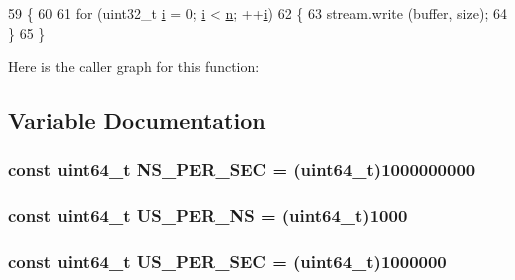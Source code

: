 \begin{DoxyCode}
59 \{
60 
61   \textcolor{keywordflow}{for} (uint32\_t \hyperlink{bernuolliDistribution_8m_a6f6ccfcf58b31cb6412107d9d5281426}{i} = 0; \hyperlink{bernuolliDistribution_8m_a6f6ccfcf58b31cb6412107d9d5281426}{i} < \hyperlink{namespacesample-rng-plot_aeb5ee5c431e338ef39b7ac5431242e1d}{n}; ++\hyperlink{bernuolliDistribution_8m_a6f6ccfcf58b31cb6412107d9d5281426}{i})
62     \{
63       stream.write (buffer, size);
64     \}
65 \}
\end{DoxyCode}


Here is the caller graph for this function\+:




\subsection{Variable Documentation}
\subsubsection[{\texorpdfstring{N\+S\+\_\+\+P\+E\+R\+\_\+\+S\+EC}{NS_PER_SEC}}]{\setlength{\rightskip}{0pt plus 5cm}const uint64\+\_\+t N\+S\+\_\+\+P\+E\+R\+\_\+\+S\+EC = (uint64\+\_\+t)1000000000\hspace{0.3cm}{\ttfamily [static]}}\hypertarget{perf-io_8cc_a479bcca5923196d202ddc97a0c52ccfc}{}\label{perf-io_8cc_a479bcca5923196d202ddc97a0c52ccfc}
\subsubsection[{\texorpdfstring{U\+S\+\_\+\+P\+E\+R\+\_\+\+NS}{US_PER_NS}}]{\setlength{\rightskip}{0pt plus 5cm}const uint64\+\_\+t U\+S\+\_\+\+P\+E\+R\+\_\+\+NS = (uint64\+\_\+t)1000\hspace{0.3cm}{\ttfamily [static]}}\hypertarget{perf-io_8cc_a68163ff157df4ce1da3deb9c8e8caf0a}{}\label{perf-io_8cc_a68163ff157df4ce1da3deb9c8e8caf0a}
\subsubsection[{\texorpdfstring{U\+S\+\_\+\+P\+E\+R\+\_\+\+S\+EC}{US_PER_SEC}}]{\setlength{\rightskip}{0pt plus 5cm}const uint64\+\_\+t U\+S\+\_\+\+P\+E\+R\+\_\+\+S\+EC = (uint64\+\_\+t)1000000\hspace{0.3cm}{\ttfamily [static]}}\hypertarget{perf-io_8cc_ae9bec129e5ccb16d3354f8c86275ddce}{}\label{perf-io_8cc_ae9bec129e5ccb16d3354f8c86275ddce}
